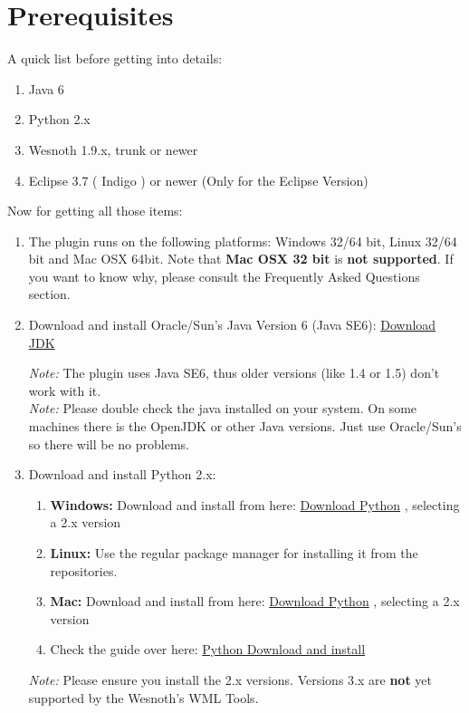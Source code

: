 \documentclass[10pt]{article}
\begin{document}
\section{Prerequisites}
A quick list before getting into details:
\begin{enumerate}
\item Java 6
\item Python 2.x
\item Wesnoth 1.9.x, trunk or newer
\item Eclipse 3.7 ( Indigo ) or newer (Only for the Eclipse Version)
\end{enumerate}

Now for getting all those items:
\begin{enumerate}
\item The plugin runs on the following platforms: Windows 32/64 bit, Linux 32/64 bit and Mac OSX 64bit. Note that \textbf{Mac OSX 32 bit} is \textbf{not supported}. If you want to know why, please consult the Frequently Asked Questions section.
\item Download and install Oracle/Sun's Java Version 6 (Java SE6): \href{http://java.sun.com/javase/downloads/widget/jdk6.jsp}{Download JDK}

\textit{Note:} The plugin uses Java SE6, thus older versions (like 1.4 or 1.5) don't work with it.\\
\textit{Note:} Please double check the java installed on your system. On some machines there is the OpenJDK or other Java versions. Just use Oracle/Sun's so there will be no problems.

\item Download and install Python 2.x:
 \begin{enumerate}
   \item \textbf{Windows:} Download and install from here: \href{http://python.org/download/}{Download Python} , selecting a 2.x version
   \item \textbf{Linux:} Use the regular package manager for installing it from the repositories.
   \item \textbf{Mac:} Download and install from here: \href{http://python.org/download/}{Download Python} , selecting a 2.x version
   \item Check the guide over here: \href{http://wiki.python.org/moin/BeginnersGuide/Download}{Python Download and install}
  \end{enumerate}
 \textit{Note:} Please ensure you install the 2.x versions. Versions 3.x are \textbf{not} yet supported by the Wesnoth's WML Tools.


\end{enumerate}
\end{document}
